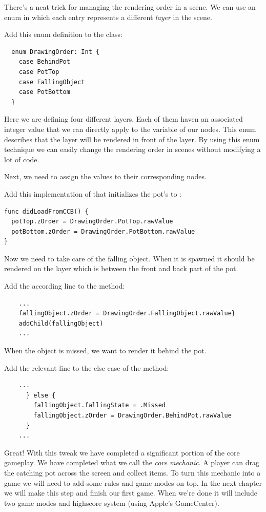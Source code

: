 There's a neat trick for managing the rendering order in a scene. We can use an
enum in which each entry represents a different \textit{layer} in the scene.

\begin{leftbar}
Add this enum definition to the  class:
\begin{lstlisting}
  enum DrawingOrder: Int {
    case BehindPot
    case PotTop
    case FallingObject
    case PotBottom
  }
\end{lstlisting}
\end{leftbar}
Here we are defining four different layers. Each of them haven an associated
integer value that we can directly apply to the 
variable of our nodes. This enum describes that the 
layer will be rendered in front of the  layer.
By using this enum technique we can easily change the rendering order in scenes
without modifying a lot of code.

Next, we need to assign the  values to their corresponding
nodes.

\begin{leftbar}
Add this implementation of  that initializes the
pot's  to :
\begin{lstlisting}
func didLoadFromCCB() {
  potTop.zOrder = DrawingOrder.PotTop.rawValue
  potBottom.zOrder = DrawingOrder.PotBottom.rawValue
}
\end{lstlisting}
\end{leftbar}

Now we need to take care of the falling object. When it is spawned it should be
rendered on the  layer which is between
the front and back part of the pot.

\begin{leftbar}
Add the according line to the  method:
\begin{lstlisting}
    ...
    fallingObject.zOrder = DrawingOrder.FallingObject.rawValue}
    addChild(fallingObject)
    ...
\end{lstlisting}
\end{leftbar}

When the object is missed, we want to render it behind the pot.
\begin{leftbar}
Add the relevant line to the else case of the 
method:
\begin{lstlisting}
    ...
      } else {
        fallingObject.fallingState = .Missed
        fallingObject.zOrder = DrawingOrder.BehindPot.rawValue
      }
    ...
\end{lstlisting}
\end{leftbar}
Great! With this tweak we have completed a significant portion of the core
gameplay. We have completed what we call the \textit{core mechanic}. A player
can drag the catching pot across the screen and collect items. To turn this
mechanic into a game we will need to add some rules and game modes on top. In
the next chapter we will make this step and finish our first game. When we're
done it will include two game modes and highscore system (using Apple's
GameCenter).

